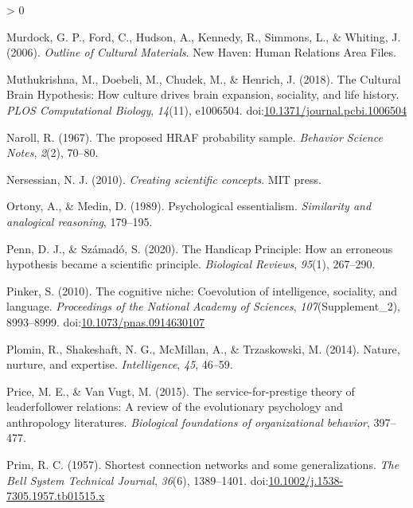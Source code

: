 \documentclass[
  11pt,
]{article}
\newlength{\cslhangindent}
\newenvironment{CSLReferences}[2] %
 {%
  \setlength{\parindent}{0pt}
  \ifodd #1 \everypar{\setlength{\hangindent}{\cslhangindent}}\ignorespaces\fi
  \ifnum #2 > 0
  \setlength{\parskip}{#2\baselineskip}
  \fi
 }%
 {}
\begin{document}
\begin{CSLReferences}{1}{0}
\leavevmode\hypertarget{ref-murdockOutlineCulturalMaterials2006}{}%
Murdock, G. P., Ford, C., Hudson, A., Kennedy, R., Simmons, L., \& Whiting, J. (2006). \emph{Outline of {Cultural Materials}}. {New Haven}: {Human Relations Area Files}.

\leavevmode\hypertarget{ref-muthukrishnaCulturalBrainHypothesis2018}{}%
Muthukrishna, M., Doebeli, M., Chudek, M., \& Henrich, J. (2018). The {Cultural Brain Hypothesis}: {How} culture drives brain expansion, sociality, and life history. \emph{PLOS Computational Biology}, \emph{14}(11), e1006504. doi:\href{https://doi.org/10.1371/journal.pcbi.1006504}{10.1371/journal.pcbi.1006504}

\leavevmode\hypertarget{ref-narollProposedHRAFProbability1967}{}%
Naroll, R. (1967). The proposed {HRAF} probability sample. \emph{Behavior Science Notes}, \emph{2}(2), 70--80.

\leavevmode\hypertarget{ref-nersessianCreatingScientificConcepts2010}{}%
Nersessian, N. J. (2010). \emph{Creating scientific concepts}. {MIT press}.

\leavevmode\hypertarget{ref-ortonyPsychologicalEssentialism1989}{}%
Ortony, A., \& Medin, D. (1989). Psychological essentialism. \emph{Similarity and analogical reasoning}, 179--195.

\leavevmode\hypertarget{ref-pennHandicapPrincipleHow2020}{}%
Penn, D. J., \& Számadó, S. (2020). The {Handicap Principle}: How an erroneous hypothesis became a scientific principle. \emph{Biological Reviews}, \emph{95}(1), 267--290.

\leavevmode\hypertarget{ref-pinkerCognitiveNicheCoevolution2010}{}%
Pinker, S. (2010). The cognitive niche: {Coevolution} of intelligence, sociality, and language. \emph{Proceedings of the National Academy of Sciences}, \emph{107}(Supplement\_2), 8993--8999. doi:\href{https://doi.org/10.1073/pnas.0914630107}{10.1073/pnas.0914630107}

\leavevmode\hypertarget{ref-plominNatureNurtureExpertise2014}{}%
Plomin, R., Shakeshaft, N. G., McMillan, A., \& Trzaskowski, M. (2014). Nature, nurture, and expertise. \emph{Intelligence}, \emph{45}, 46--59.

\leavevmode\hypertarget{ref-price2015service}{}%
Price, M. E., \& Van Vugt, M. (2015). The service-for-prestige theory of leader{}follower relations: {A} review of the evolutionary psychology and anthropology literatures. \emph{Biological foundations of organizational behavior}, 397--477.

\leavevmode\hypertarget{ref-primShortestConnectionNetworks1957}{}%
Prim, R. C. (1957). Shortest connection networks and some generalizations. \emph{The Bell System Technical Journal}, \emph{36}(6), 1389--1401. doi:\href{https://doi.org/10.1002/j.1538-7305.1957.tb01515.x}{10.1002/j.1538-7305.1957.tb01515.x}


\end{CSLReferences}
\end{document}
